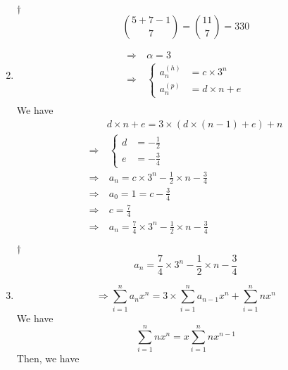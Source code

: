\documentclass[a4paper,12pt]{article}
\begin{document}
\begin{enumerate}
\begin{answer}{$\dag$}
\begin{equation}
			\binom{5 + 7 - 1}{7} = \binom{11}{7} = 330
		\end{equation}
	\end{answer}
	\item \begin{equation}
		\begin{aligned}
			\Rightarrow & \ \alpha = 3 \\
			\Rightarrow & \ \begin{cases}
				a_n^{(h)} & = c \times 3^n \\
				a_n^{(p)} & = d \times n + e
			\end{cases} \\
		\end{aligned}
	\end{equation}
	We have \begin{equation}
		\begin{aligned}
			& d \times n + e = 3 \times (d \times (n - 1) + e) + n \\
			\Rightarrow & \ \begin{cases}
				d & = -\frac{1}{2} \\
				e & = -\frac{3}{4}
			\end{cases} \\
			\Rightarrow & \ a_n = c \times 3^n -\frac{1}{2} \times n - \frac{3}{4} \\
			\Rightarrow & \ a_0 = 1 = c - \frac{3}{4} \\
			\Rightarrow & \ c = \frac{7}{4} \\
			\Rightarrow & \ a_n = \frac{7}{4} \times 3^n - \frac{1}{2} \times n - \frac{3}{4}
		\end{aligned}
	\end{equation}
	\begin{answer}{$\dag$}
		\begin{equation}
			a_n = \frac{7}{4} \times 3^n - \frac{1}{2} \times n - \frac{3}{4}
		\end{equation}
	\end{answer}
	\item \begin{equation}
		\Rightarrow \sum_{i = 1}^n a_n x^n = 3 \times \sum_{i = 1}^n a_{n - 1}x^n + \sum_{i = 1}^n nx^n
	\end{equation} We have \begin{equation}
		\sum_{i = 1}^n nx^n = x\sum_{i = 1}^n nx^{n - 1}
	\end{equation} Then, we have \begin{equation}
		\begin{aligned}

\end{aligned}
\end{equation}
\end{enumerate}
\end{document}
